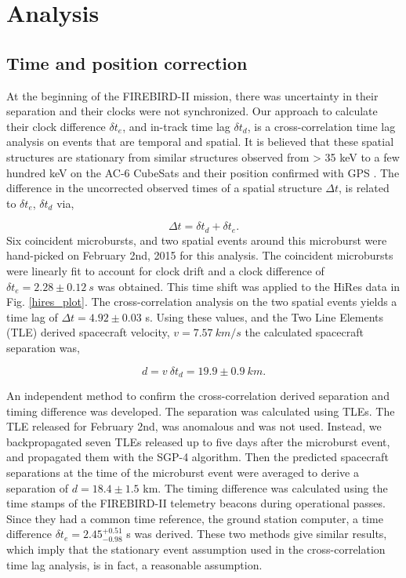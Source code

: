 \documentclass[draft,linenumbers]{agujournal}
\begin{document}
\section{Analysis} \label{analysis} %
\subsection{Time and position correction} \label{corrections}
At the beginning of the FIREBIRD-II mission, there was uncertainty in their separation and their clocks were not synchronized. Our approach to calculate their clock difference $\delta t_{e}$, and in-track time lag $\delta t_{d}$, is a cross-correlation time lag analysis on events that are temporal and spatial. It is believed that these spatial structures are stationary from similar structures observed from > 35 keV to a few hundred keV on the AC-6 CubeSats and their position confirmed with GPS \citep{Blake16}. The difference in the uncorrected observed times of a spatial structure $\Delta t$, is related to $\delta t_{e}$, $\delta t_{d}$ via,

\begin{equation}
\Delta t = \delta t_{d} + \delta t_{e}.
\end{equation} Six coincident microbursts, and two spatial events around this microburst were hand-picked on February 2nd, 2015 for this analysis. The coincident microbursts were linearly fit to account for clock drift and a clock difference of $\delta t_{e} = 2.28 \pm 0.12 \ s$ was obtained. This time shift was applied to the HiRes data in Fig. \ref{hires_plot}. The cross-correlation analysis on the two spatial events yields a time lag of $\Delta t = 4.92 \pm 0.03$ s. Using these values, and the Two Line Elements (TLE) derived spacecraft velocity, $v = 7.57 \ km/s$ the calculated spacecraft separation was,

\begin{equation}
d = v \ \delta t_{d} = 19.9 \pm 0.9 \ km.
\end{equation}

An independent method to confirm the cross-correlation derived separation and timing difference was developed. The separation was calculated using TLEs. The TLE released for February 2nd, was anomalous and was not used. Instead, we backpropagated seven TLEs released up to five days after the microburst event, and propagated them with the SGP-4 algorithm. Then the predicted spacecraft separations at the time of the microburst event were averaged to derive a separation of $d = 18.4 \pm 1.5$ km. The timing difference was calculated using the time stamps of the FIREBIRD-II telemetry beacons during operational passes. Since they had a common time reference, the ground station computer, a time difference $\delta t_{e}  = 2.45^{+ 0.51}_{-0.98}$ s was derived. These two methods give similar results, which imply that the stationary event assumption used in the cross-correlation time lag analysis, is in fact, a reasonable assumption.
\end{document}
